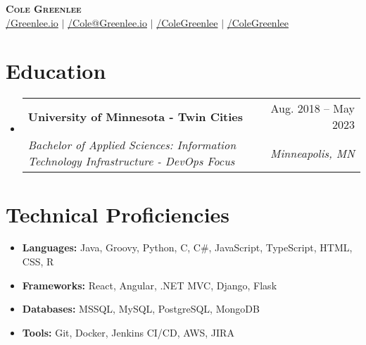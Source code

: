 \documentclass[letterpaper,11pt]{article}
\makeatletter
\newcommand{\techSkillItem}[2]{\item{\small{\textbf{#1: }{#2}}}\vspace{-5pt}}
\newcommand{\techSkillList}[1]{\begin{itemize}[leftmargin=0.15in]#1\end{itemize}\vspace{-10pt}}
\newcommand{\resumeSection}[2]{\section{#1}\begin{itemize}[leftmargin=0.15in, label={}]#2\end{itemize}}
\newcommand{\resumeItemHeading}[4]{\vspace{-2pt}\item{\begin{tabular*}{0.97\textwidth}[t]{l@{\extracolsep{\fill}}r}\textbf{#1} & #2\\\textit{\small#3} & \textit{\small #4}\\\end{tabular*}\vspace{-7pt}}}
\makeatother
\begin{document}
\begin{center}
	\begin{small}
		\textbf{\Huge \scshape Cole Greenlee} \\ \vspace{5pt}
		\href{https://Greenlee.io/}{\faGlobe/Greenlee.io}  $|$
		\href{mailto:Cole@Greenlee.io}{\faEnvelope[regular]/Cole@Greenlee.io} $|$
		\href{https://LinkedIn.com/in/ColeGreenlee}{\faLinkedin/ColeGreenlee} $|$
		\href{https://GitHub.com/ColeGreenlee}{\faGithub/ColeGreenlee}
	\end{small}
\end{center}

\resumeSection{Education}{
	\resumeItemHeading{University of Minnesota - Twin Cities}{Aug. 2018 -- May 2023}{Bachelor of Applied Sciences: Information Technology Infrastructure - DevOps Focus}{Minneapolis, MN}
}

\section{Technical Proficiencies}
\techSkillList{
	\techSkillItem{Languages}{Java, Groovy, Python, C, C\#, JavaScript, TypeScript, HTML, CSS, R}
	\techSkillItem{Frameworks}{ React, Angular, .NET MVC, Django, Flask}
	\techSkillItem{Databases}{MSSQL, MySQL, PostgreSQL, MongoDB}
	\techSkillItem{Tools}{Git, Docker, Jenkins CI/CD, AWS, JIRA}
}
\end{document}
